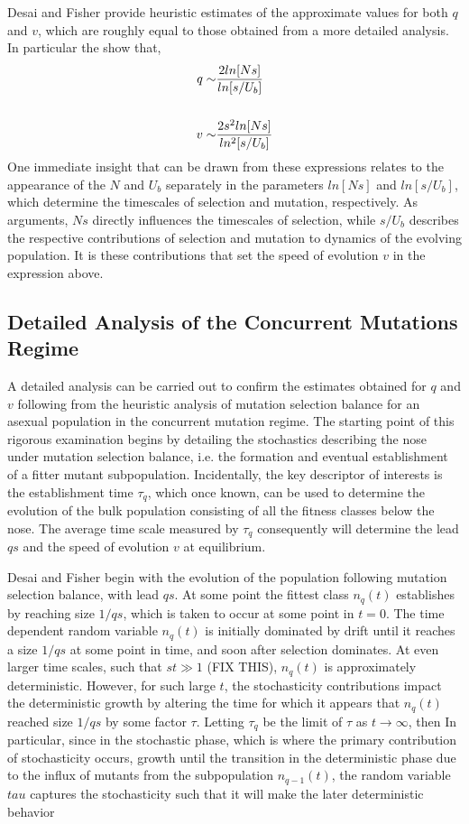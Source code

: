 \documentclass[12pt,twocolumn]{article}
\begin{document}
Desai and Fisher provide heuristic estimates of the approximate values for both $q$ and $v$, which are roughly equal to those obtained from a more detailed analysis.  In particular the show that,
\begin{align*}
q \sim & {2ln[Ns] \over ln[s/U_b]} \\   
\\
v \sim & {2s^2ln[Ns] \over ln^2[s/U_b]}
\end{align*}
One immediate insight that can be drawn from these expressions relates to the appearance of the $N$ and $U_b$ separately in the parameters $ln[Ns]$ and $ln[s/U_b]$, which determine the timescales of selection and mutation, respectively.  As arguments, $Ns$ directly influences the timescales of selection, while $s/U_b$ describes the respective contributions of selection and mutation to dynamics of the evolving population.  It is these contributions that set the speed of evolution $v$ in the expression above.   

\subsection*{Detailed Analysis of the Concurrent Mutations Regime}
A detailed analysis can be carried out to confirm the estimates obtained for $q$ and $v$ following from the heuristic analysis of mutation selection balance for an asexual population in the concurrent mutation regime.  The starting point of this rigorous examination begins by detailing the stochastics describing the nose under mutation selection balance, i.e. the formation and eventual establishment of a fitter mutant subpopulation.  Incidentally, the key descriptor of interests is the establishment time $\tau_q$, which once known, can be used to determine the evolution of the bulk population consisting of all the fitness classes below the nose.  The average time scale measured by $\tau_q$ consequently will determine the lead $qs$ and the speed of evolution $v$ at equilibrium. 

Desai and Fisher begin with the evolution of the population following mutation selection balance, with lead $qs $.  At some point the fittest class $n_q(t)$ establishes by reaching size $1/qs$, which is taken to occur at some point in $t=0$.  The time dependent random variable $n_q(t)$ is initially dominated by drift until it reaches a size $1/qs$ at some point in time, and soon after selection dominates.  At even larger time scales, such that $st\gg 1$ (FIX THIS), $n_q(t)$ is approximately deterministic.  However, for such large $t$, the stochasticity contributions impact the deterministic growth by altering the time for which it appears that $n_q(t)$ reached size $1/qs$ by some factor $\tau$.  Letting $\tau_q$ be the limit of $\tau$ as $t \rightarrow \infty$, then  In particular, since in the stochastic phase, which is where the primary contribution of stochasticity occurs, growth until the transition in the deterministic phase due to the influx of mutants from the subpopulation $n_{q-1}(t)$, the random variable $tau$ captures the stochasticity such that it will make the later deterministic behavior
\end{document}
